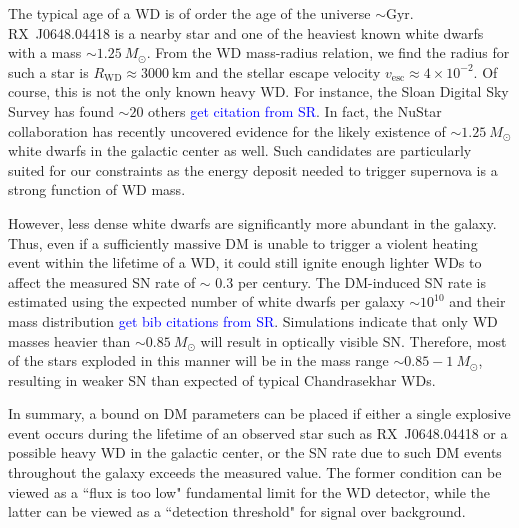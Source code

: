 \documentclass[twocolumn,showpacs,preprintnumbers,amsmath,amssymb,prd]{revtex4}
\begin{document}
The typical age of a WD is of order the age of the universe $\sim \text{Gyr}$.
RX~J0648.04418 is a nearby star and one of the heaviest known white dwarfs with a mass $\sim 1.25 ~M_{\odot}$.
From the WD mass-radius relation, we find the radius for such a star is $R_\text{WD} \approx 3000~\text{km}$ and the stellar escape velocity $v_\text{esc} \approx 4 \times 10^{-2}$.
Of course, this is not the only known heavy WD.
For instance, the Sloan Digital Sky Survey has found $\sim 20$ others \textcolor{blue}{get citation from SR}.
In fact, the NuStar collaboration has recently uncovered evidence for the likely existence of $\sim 1.25 ~M_{\odot}$ white dwarfs in the galactic center as well.
Such candidates are particularly suited for our constraints as the energy deposit needed to trigger supernova is a strong function of WD mass.

However, less dense white dwarfs are significantly more abundant in the galaxy.
Thus, even if a sufficiently massive DM is unable to trigger a violent heating event within the lifetime of a WD, it could still ignite enough lighter WDs to affect the measured SN rate of $\sim $ 0.3 per century.
The DM-induced SN rate is estimated using the expected number of white dwarfs per galaxy $\sim 10^{10}$ and their mass distribution \textcolor{blue}{get bib citations from SR}.
Simulations indicate that only WD masses heavier than $\sim 0.85 ~M_{\odot}$ will result in optically visible SN.
Therefore, most of the stars exploded in this manner will be in the mass range $\sim 0.85 - 1 ~M_{\odot}$, resulting in weaker SN than expected of typical Chandrasekhar WDs.

In summary, a bound on DM parameters can be placed if either a single explosive event occurs during the lifetime of an observed star such as RX~J0648.04418 or a possible heavy WD in the galactic center, or the SN rate due to such DM events throughout the galaxy exceeds the measured value.
The former condition can be viewed as a ``flux is too low" fundamental limit for the WD detector, while the latter can be viewed as a ``detection threshold" for signal over background.
\end{document}
